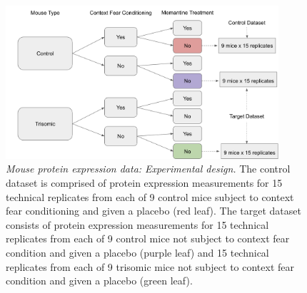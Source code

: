 \documentclass{article}
\begin{document}
\begin{figure}[!htbp]
    \centering
    \includegraphics[width=0.9\textwidth]{figures/mice_exp_design}
    \caption{
    {\em Mouse protein expression data: Experimental design.} 
    The control dataset is comprised of protein expression measurements for 15 technical replicates from each of 9 control mice subject to context fear conditioning and given a placebo (red leaf). The target dataset consists of protein expression measurements for 15 technical replicates from each of 9 control mice not subject to context fear condition and given a placebo (purple leaf) and 15 technical replicates from each of 9 trisomic mice not subject to context fear condition and given a placebo (green leaf).}
    \label{fig:exp_design}
\end{figure}
\end{document}
